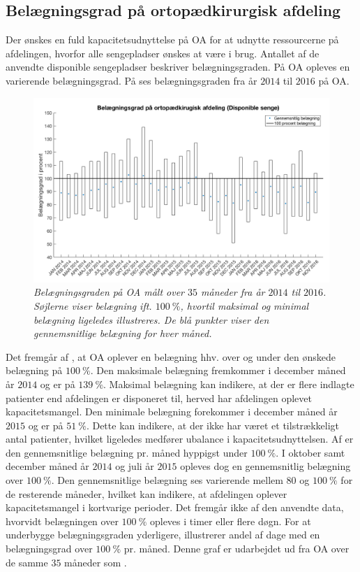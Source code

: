 \subsection{Belægningsgrad på ortopædkirurgisk afdeling}\label{omfang}
Der ønskes en fuld kapacitetsudnyttelse på OA for at udnytte ressourcerne på afdelingen, hvorfor alle sengepladser ønskes at være i brug. Antallet af de anvendte disponible sengepladser beskriver belægningsgraden. På OA opleves en varierende belægningsgrad. På  ses belægningsgraden fra år $2014$ til $2016$ på OA.\cite{SDS2015}

\begin{figure}[H]
	\flushleft 
	\centering
	\includegraphics[scale=.35]{figures/belaegningsgradny.png}
	\flushleft
	\caption{\textit{Belægningsgraden på OA målt over $35$ måneder fra år $2014$ til $2016$. Søjlerne viser belægning ift. $100~\%$, hvortil maksimal og minimal belægning ligeledes illustreres. De blå punkter viser den gennemsnitlige belægning for hver måned.}\cite{SDS2015}}
	\label{maxminbelaeg}
\end{figure}

\noindent
Det fremgår af , at OA oplever en belægning hhv. over og under den ønskede belægning på $100~\%$. Den maksimale belægning fremkommer i december måned år $2014$ og er på $139~\%$. Maksimal belægning kan indikere, at der er flere indlagte patienter end afdelingen er disponeret til, herved har afdelingen oplevet kapacitetsmangel. Den minimale belægning forekommer i december måned år $2015$ og er på $51~\%$. Dette kan indikere, at der ikke har været et tilstrækkeligt antal patienter, hvilket ligeledes medfører ubalance i kapacitetsudnyttelsen. Af  er den gennemsnitlige belægning pr. måned hyppigst under $100~\%$. I oktober samt december måned år $2014$ og juli år $2015$ opleves dog en gennemsnitlig belægning over $100~\%$. Den gennemsnitlige belægning ses varierende mellem $80$ og $100~\%$ for de resterende måneder, hvilket kan indikere, at afdelingen oplever kapacitetsmangel i kortvarige perioder.
Det fremgår ikke af den anvendte data, hvorvidt belægningen over $100~\%$ opleves i timer eller flere døgn.
For at underbygge belægningsgraden yderligere, illustrerer  andel af dage med en belægningsgrad over $100~\%$ pr. måned. 
Denne graf er udarbejdet ud fra OA over de samme $35$ måneder som .\cite{SDS2015} 

